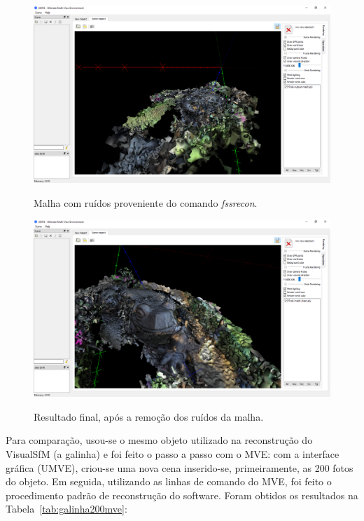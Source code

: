 \begin{figure}[!h]
	\centering
	\caption{%
	Malha com ruídos proveniente do comando \emph{fssrecon}.
	}
	\includegraphics[width=1\linewidth]{figs/mvemeshout.png}
		\label{fig:MVEFSSRMesh}
\end{figure} 

\begin{figure}[!h]
	\centering
	\caption{%
	Resultado final, após a remoção dos ruídos da malha.
	}
	\includegraphics[width=1\linewidth]{figs/mvemeshclean.png}
		\label{fig:MVEMeshClean}
\end{figure} 

Para comparação, usou-se o mesmo objeto utilizado na reconstrução do VisualSfM (a
galinha) e foi feito o passo a passo com o MVE: com a interface gráfica (UMVE),
criou-se uma nova cena inserido-se, primeiramente, as 200 fotos do objeto. Em
seguida, utilizando as linhas de comando do MVE, foi feito o procedimento padrão
de reconstrução do software. Foram obtidos os resultados na Tabela~\ref{tab:galinha200mve}:

